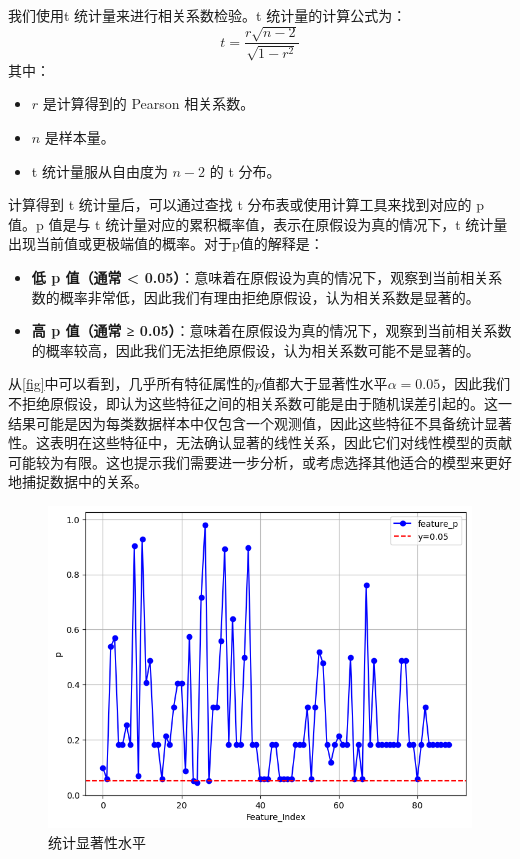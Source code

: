 我们使用t 统计量来进行相关系数检验。t 统计量的计算公式为：
\begin{equation}
t = \frac{r \sqrt{n - 2}}{\sqrt{1 - r^2}}
\label{eq:t}
\end{equation}
其中：
\begin{itemize}
    \item \(r\) 是计算得到的 Pearson 相关系数。
    \item \(n\) 是样本量。
    \item t 统计量服从自由度为 \(n - 2\) 的 t 分布。
\end{itemize}
计算得到 t 统计量后，可以通过查找 t 分布表或使用计算工具来找到对应的 p 值。p 值是与 t 统计量对应的累积概率值，表示在原假设为真的情况下，t 统计量出现当前值或更极端值的概率。对于p值的解释是：
\begin{itemize}
    \item \textbf{低 p 值（通常 < 0.05）}：意味着在原假设为真的情况下，观察到当前相关系数的概率非常低，因此我们有理由拒绝原假设，认为相关系数是显著的。
    \item \textbf{高 p 值（通常 ≥ 0.05）}：意味着在原假设为真的情况下，观察到当前相关系数的概率较高，因此我们无法拒绝原假设，认为相关系数可能不是显著的。
\end{itemize}
从\autoref{fig}中可以看到，几乎所有特征属性的$p$值都大于显著性水平$\alpha = 0.05$，因此我们不拒绝原假设，即认为这些特征之间的相关系数可能是由于随机误差引起的。这一结果可能是因为每类数据样本中仅包含一个观测值，因此这些特征不具备统计显著性。这表明在这些特征中，无法确认显著的线性关系，因此它们对线性模型的贡献可能较为有限。这也提示我们需要进一步分析，或考虑选择其他适合的模型来更好地捕捉数据中的关系。
\begin{figure}[H]
    \centering
    \includegraphics[width=1\linewidth]{figures/p.png}
    \caption{统计显著性水平}
    \label{fig:p}
\end{figure}
 
